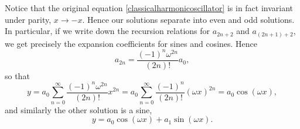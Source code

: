 Notice that the original equation \ref{classicalharmonicoscillator} is in fact invariant under parity, $x\to -x$. Hence our solutions separate into even and odd solutions. In particular, if we write down the recursion relations for $a_{2n+2}$ and $a_{(2n+1)+2}$, we get precisely the expansion coefficients for sines and cosines. Hence
\begin{equation}
    a_{2n} =\frac{(-1)^n \omega^{2n}}{(2n)!} a_0,
\end{equation}
so that
\begin{equation}
    y=a_0 \sum_{n=0}^\infty \frac{(-1)^n \omega^{2n}}{(2n)!}x^{2n} =a_0 \sum_{n=0}^\infty \frac{(-1)^n}{(2n)!}(\omega x)^{2n}= a_0 \cos(\omega x),
\end{equation}
and similarly the other solution is a sine,
\begin{equation}
    y=a_0 \cos(\omega x) + a_1\sin(\omega x).
\end{equation}